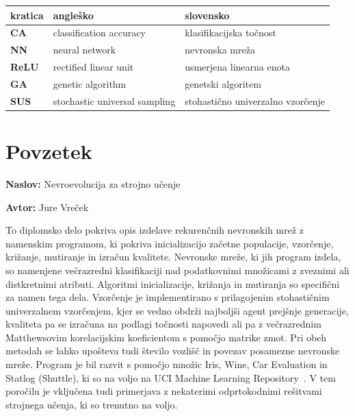 \documentclass[a4paper,12pt,openright]{book}
\newcommand{\ttitle}{Nevroevolucija za strojno učenje}
\newcommand{\tauthor}{Jure Vreček}
\newcommand{\clearemptydoublepage}{\newpage{\pagestyle{empty}\cleardoublepage}}
\begin{document}
    \noindent\begin{tabular}{p{}|p{}|p{}}    %
    \textbf{kratica}
                 & \textbf{angleško}             & \textbf{slovensko}                        \\ \hline
                 \textbf{CA}    &   classification accuracy &   klasifikacijska točnost \\
                 \textbf{NN}    &   neural network    & nevronska mreža \\
                 \textbf{ReLU}    &   rectified linear unit    & usmerjena linearna enota \\
                 \textbf{GA}    &   genetic algorithm    & genetski algoritem \\
                 \textbf{SUS}    &   stochastic universal sampling    & stohastično univerzalno vzorčenje \\
    \end{tabular}



    \clearemptydoublepage

    \chapter*{Povzetek}

    \noindent\textbf{Naslov:} \ttitle
    \bigskip

    \noindent\textbf{Avtor:} \tauthor
    \bigskip

    \noindent To diplomsko delo pokriva opis izdelave rekurenčnih nevronskih mrež z namenskim programom, ki
    pokriva inicializacijo začetne populacije, vzorčenje, križanje, mutiranje in izračun kvalitete.
    Nevronske mreže, ki jih program izdela, so namenjene večrazredni klasifikaciji nad podatkovnimi množicami z zveznimi ali distkretnimi atributi.
    Algoritmi inicializacije, križanja in mutiranja so specifični za namen tega dela.
    Vzorčenje je implementirano s prilagojenim stohastičnim univerzalnem vzorčenjem, kjer se vedno obdrži najboljši agent prejšnje
    generacije, kvaliteta pa se izračuna na podlagi točnosti napovedi ali pa z večrazrednim Matthewsovim korelacijskim koeficientom s pomočjo matrike zmot.
    Pri obeh metodah se lahko upošteva tudi število vozlišč in povezav posamezne nevronske mreže.
    Program je bil razvit s pomočjo množic Iris, Wine, Car Evaluation in Statlog (Shuttle), ki so
    na voljo na UCI Machine Learning Repository~\cite{Dua:2019}.
    V tem poročilu je vključena tudi primerjava z nekaterimi odprtokodnimi rešitvami strojnega učenja, ki so trenutno na voljo.
\end{document}
